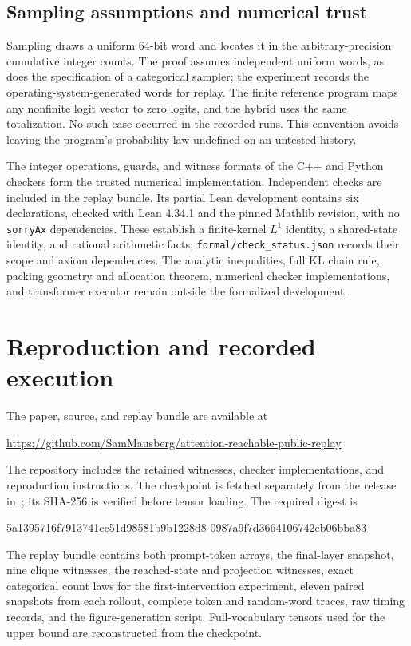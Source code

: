 \documentclass[10pt]{article}
\theoremstyle{definition}\newtheorem{definition}[theorem]{Definition}
\begin{document}
\subsection{Sampling assumptions and numerical trust}
Sampling draws a uniform 64-bit word and locates it in the arbitrary-precision cumulative integer counts. The proof assumes independent uniform words, as does the specification of a categorical sampler; the experiment records the operating-system-generated words for replay. The finite reference program maps any nonfinite logit vector to zero logits, and the hybrid uses the same totalization. No such case occurred in the recorded runs. This convention avoids leaving the program's probability law undefined on an untested history.

The integer operations, guards, and witness formats of the C++ and Python checkers form the trusted numerical implementation. Independent checks are included in the replay bundle. Its partial Lean development contains six declarations, checked with Lean 4.34.1 and the pinned Mathlib revision, with no \texttt{sorryAx} dependencies. These establish a finite-kernel $L^1$ identity, a shared-state identity, and rational arithmetic facts; \texttt{formal/check\_status.json} records their scope and axiom dependencies. The analytic inequalities, full KL chain rule, packing geometry and allocation theorem, numerical checker implementations, and transformer executor remain outside the formalized development.

\section{Reproduction and recorded execution}
\label{app:artifact}
The paper, source, and replay bundle are available at
\begin{center}\small
\url{https://github.com/SamMausberg/attention-reachable-public-replay}
\end{center}
The repository includes the retained witnesses, checker implementations, and reproduction instructions. The checkpoint is fetched separately from the release in~\citet{ggufrelease}; its SHA-256 is verified before tensor loading. The required digest is
\begin{center}\small\ttfamily
5a1395716f7913741cc51d98581b9b1228d8\allowbreak
0987a9f7d3664106742eb06bba83
\end{center}
The replay bundle contains both prompt-token arrays, the final-layer snapshot, nine clique witnesses, the reached-state and projection witnesses, exact categorical count laws for the first-intervention experiment, eleven paired snapshots from each rollout, complete token and random-word traces, raw timing records, and the figure-generation script. Full-vocabulary tensors used for the upper bound are reconstructed from the checkpoint.
\end{document}
